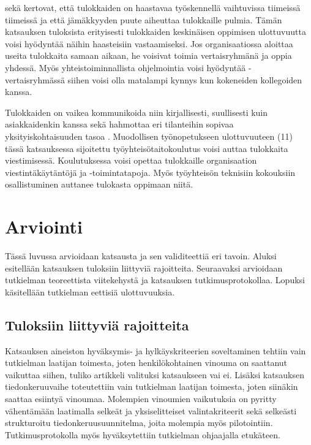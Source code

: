 \documentclass[utf8]{gradu3}
\begin{document}
\textcite{britto-ym-2019} sekä \textcite{begel-simon-2008} kertovat, että tulokkaiden on haastavaa työskennellä vaihtuvissa tiimeissä tiimeissä ja että jämäkkyyden puute aiheuttaa tulokkaille pulmia. Tämän katsauksen tuloksista erityisesti tulokkaiden keskinäisen oppimisen ulottuvuutta voisi hyödyntää näihin haasteisiin vastaamiseksi. Jos organisaatiossa aloittaa useita tulokkaita samaan aikaan, he voisivat toimia vertaisryhmänä ja oppia yhdessä. Myös yhteistoiminnallista ohjelmointia voisi hyödyntää - vertaisryhmässä siihen voisi olla matalampi kynnys kun kokeneiden kollegoiden kanssa. 

Tulokkaiden on vaikea kommunikoida niin kirjallisesti, suullisesti kuin asiakkaidenkin kanssa sekä hahmottaa eri tilanteihin sopivaa yksityiskohtaisuuden tasoa %
\parencites%
    {radermacher-ym-2015}%
    {begel-simon-2008}%
\relax.
%
Muodollisen työnopetukseen ulottuvuuteen (11) tässä katsauksessa sijoitettu työyhteisötaitokoulutus voisi auttaa tulokkaita viestimisessä. Koulutuksessa voisi opettaa tulokkaille organisaation viestintäkäytäntöjä ja -toimintatapoja. Myös työyhteisön teknisiin kokouksiin osallistuminen auttanee tulokasta oppimaan niitä.

\chapter{Arviointi}
\label{paaluku-arviointi}
 
Tässä luvussa arvioidaan katsausta ja sen validiteettiä eri tavoin. Aluksi esitellään katsauksen tuloksiin liittyviä rajoitteita. Seuraavaksi arvioidaan tutkielman teoreettista viitekehystä ja katsauksen tutkimusprotokollaa. Lopuksi käsitellään tutkielman eettisiä ulottuvuuksia.

\section{Tuloksiin liittyviä rajoitteita}
\label{luku-rajoitteet}

Katsauksen aineiston hyväksymis- ja hylkäyskriteerien soveltaminen tehtiin vain tutkielman laatijan toimesta, joten henkilökohtainen vinouma on saattanut vaikuttaa siihen, tuliko artikkeli valituksi katsaukseen vai ei. Lisäksi katsauksen tiedonkeruuvaihe toteutettiin vain tutkielman laatijan toimesta, joten siinäkin saattaa esiintyä vinoumaa. Molempien vinoumien vaikutuksia on pyritty vähentämään laatimalla selkeät ja yksiselitteiset valintakriteerit sekä selkeästi strukturoitu tiedonkeruusuunnitelma, joita molempia myös pilotointiin. Tutkimusprotokolla myös hyväksytettiin tutkielman ohjaajalla etukäteen. 
\end{document}
